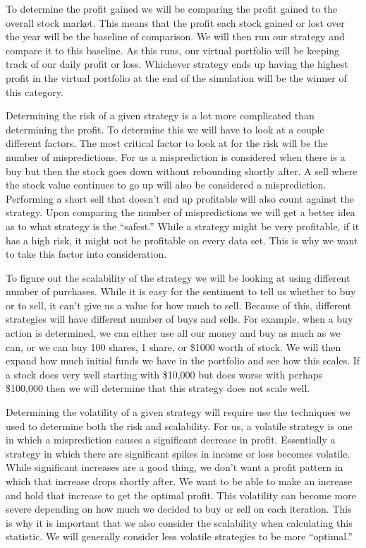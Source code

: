 To determine the profit gained we will be comparing the profit gained to the overall stock market. This means that the profit each stock gained or lost over the year will be the baseline of comparison. We will then run our strategy and compare it to this baseline. As this runs, our virtual portfolio will be keeping track of our daily profit or loss. Whichever strategy ends up having the highest profit in the virtual portfolio at the end of the simulation will be the winner of this category.

Determining the risk of a given strategy is a lot more complicated than determining the profit. To determine this we will have to look at a couple different factors. The most critical factor to look at for the risk will be the number of mispredictions. For us a misprediction is considered when there is a buy but then the stock goes down without rebounding shortly after. A sell where the stock value continues to go up will also be considered a misprediction. Performing a short sell that doesn’t end up profitable will also count against the strategy. Upon comparing the number of mispredictions we will get a better idea as to what strategy is the “safest.” While a strategy might be very profitable, if it has a high risk, it might not be profitable on every data set. This is why we want to take this factor into consideration.

To figure out the scalability of the strategy we will be looking at using different number of purchases. While it is easy for the sentiment to tell us whether to buy or to sell, it can't give us a value for how much to sell. Because of this, different strategies will have different number of buys and sells. For example, when a buy action is determined, we can either use all our money and buy as much as we can, or we can buy 100 shares, 1 share, or \$1000 worth of stock. We will then expand how much initial funds we have in the portfolio and see how this scales. If a stock does very well starting with \$10,000 but does worse with perhaps \$100,000 then we will determine that this strategy does not scale well.

Determining the volatility of a given strategy will require use the techniques we used to determine both the risk and scalability. For us, a volatile strategy is one in which a misprediction causes a significant decrease in profit. Essentially a strategy in which there are significant spikes in income or loss becomes volatile. While significant increases are a good thing, we don’t want a profit pattern in which that increase drops shortly after. We want to be able to make an increase and hold that increase to get the optimal profit. This volatility can become more severe depending on how much we decided to buy or sell on each iteration. This is why it is important that we also consider the scalability when calculating this statistic. We will generally consider less volatile strategies to be more “optimal.”


